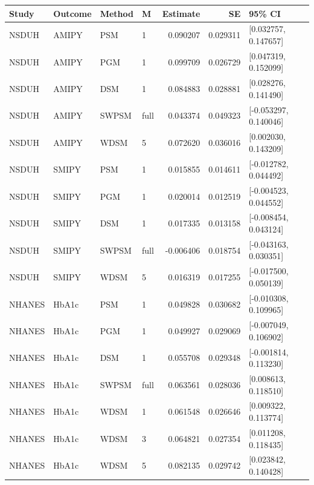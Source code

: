 \begin{tabular}{llllrrl}
\hline
Study & Outcome & Method & M & Estimate & SE & 95\% CI \\
\hline
NSDUH & AMIPY & PSM & 1 & 0.090207 & 0.029311 & [0.032757, 0.147657] \\
NSDUH & AMIPY & PGM & 1 & 0.099709 & 0.026729 & [0.047319, 0.152099] \\
NSDUH & AMIPY & DSM & 1 & 0.084883 & 0.028881 & [0.028276, 0.141490] \\
NSDUH & AMIPY & SWPSM & full & 0.043374 & 0.049323 & [-0.053297, 0.140046] \\
NSDUH & AMIPY & WDSM & 5 & 0.072620 & 0.036016 & [0.002030, 0.143209] \\
NSDUH & SMIPY & PSM & 1 & 0.015855 & 0.014611 & [-0.012782, 0.044492] \\
NSDUH & SMIPY & PGM & 1 & 0.020014 & 0.012519 & [-0.004523, 0.044552] \\
NSDUH & SMIPY & DSM & 1 & 0.017335 & 0.013158 & [-0.008454, 0.043124] \\
NSDUH & SMIPY & SWPSM & full & -0.006406 & 0.018754 & [-0.043163, 0.030351] \\
NSDUH & SMIPY & WDSM & 5 & 0.016319 & 0.017255 & [-0.017500, 0.050139] \\
NHANES & HbA1c & PSM & 1 & 0.049828 & 0.030682 & [-0.010308, 0.109965] \\
NHANES & HbA1c & PGM & 1 & 0.049927 & 0.029069 & [-0.007049, 0.106902] \\
NHANES & HbA1c & DSM & 1 & 0.055708 & 0.029348 & [-0.001814, 0.113230] \\
NHANES & HbA1c & SWPSM & full & 0.063561 & 0.028036 & [0.008613, 0.118510] \\
NHANES & HbA1c & WDSM & 1 & 0.061548 & 0.026646 & [0.009322, 0.113774] \\
NHANES & HbA1c & WDSM & 3 & 0.064821 & 0.027354 & [0.011208, 0.118435] \\
NHANES & HbA1c & WDSM & 5 & 0.082135 & 0.029742 & [0.023842, 0.140428] \\
\hline
\end{tabular}
